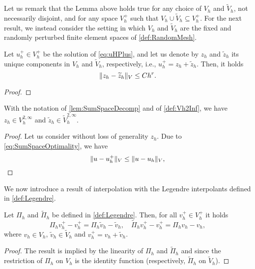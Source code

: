 Let us remark that the Lemma above holds true for any choice of $V_h$ and $\widetilde V_h$, not necessarily disjoint, and for any space $V_h^+$ such that $V_h \cup \widetilde V_h \subseteq V_h^+$. For the next result, we instead consider the setting in which $V_h$ and $\widetilde V_h$ are the fixed and randomly perturbed finite element spaces of \cref{def:RandomMesh}. 

\begin{lemma}\label{lem:SumSpaceDecomp} Let $u_h^+ \in V_h^+$ be the solution of \eqref{eq:uHPlus}, and let us denote by $z_h$ and $\widetilde z_h$ its unique components in $V_h$ and $\widetilde V_h$, respectively, i.e., $u_h^+ = z_h + \widetilde z_h$. Then, it holds
	\begin{equation}
		\lVert z_h - \widetilde z_h\rVert_V \leq Ch^r.
	\end{equation}
\end{lemma}
\begin{proof}
	
\end{proof}

\begin{corollary} With the notation of \cref{lem:SumSpaceDecomp} and of \cref{def:Vh2Inf}, we have $z_h \in V_h^{2, \infty}$ and $\widetilde z_h \in \widetilde V_h^{2, \infty}$.
\end{corollary}
\begin{proof} Let us consider without loss of generality $z_h$. Due to \eqref{eq:SumSpaceOptimality}, we have
	\begin{equation}
		\lVert u - u_h^+\rVert_V \leq \lVert u - u_h\rVert_V,
	\end{equation}
\end{proof}


We now introduce a result of interpolation with the Legendre interpolants defined in \cref{def:Legendre}.

\begin{lemma}\label{lem:InterpSum} Let $\Pi_h$ and $\widetilde \Pi_h$ be defined in \cref{def:Legendre}. Then, for all $v_h^+ \in V_h^+$ it holds
	\begin{equation}
	\Pi_h v_h^+ - v_h^+ = \Pi_h \widetilde v_h - \widetilde v_h,  \quad 	\widetilde \Pi_h v^+_h - v_h^+ = \Pi_h v_h - v_h,
	\end{equation} 
	where $v_h \in V_h$, $\widetilde v_h \in \widetilde V_h$ and $v_h^+ = v_h + \widetilde v_h$.
\end{lemma}
\begin{proof} The result is implied by the linearity of $\Pi_h$ and $\widetilde \Pi_h$ and since the restriction of $\Pi_h$ on $V_h$ is the identity function (respectively, $\widetilde \Pi_h$ on $\widetilde V_h$).
\end{proof}

